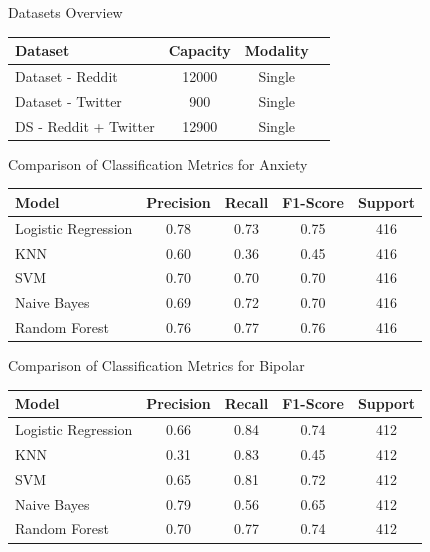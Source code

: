 \begin{center}
    \centering
    Datasets Overview \\
    \vspace{0.05in}
    \begin{tabular}{|l|c|c|c|}
    \hline
    \textbf{Dataset} & \textbf{Capacity} & \textbf{Modality} \\ \hline
    Dataset - Reddit  & 12000              & Single            \\ \hline
    Dataset - Twitter  & 900                & Single            \\ \hline
    DS - Reddit + Twitter & 12900          & Single            \\ \hline
    \end{tabular}

    \vspace{0.25in}

\centering
Comparison of Classification Metrics for Anxiety
\begin{tabular}{|l|c|c|c|c|}
\hline
\textbf{Model} & \textbf{Precision} & \textbf{Recall} & \textbf{F1-Score} & \textbf{Support} \\ \hline
Logistic Regression & 0.78 & 0.73 & 0.75 & 416 \\ \hline
KNN                & 0.60 & 0.36 & 0.45 & 416 \\ \hline
SVM                & 0.70 & 0.70 & 0.70 & 416 \\ \hline
Naive Bayes        & 0.69 & 0.72 & 0.70 & 416 \\ \hline
Random Forest      & 0.76 & 0.77 & 0.76 & 416 \\ \hline
\end{tabular}

\vspace{0.25in}

\centering
Comparison of Classification Metrics for Bipolar
\begin{tabular}{|l|c|c|c|c|}
\hline
\textbf{Model} & \textbf{Precision} & \textbf{Recall} & \textbf{F1-Score} & \textbf{Support} \\ \hline
Logistic Regression & 0.66 & 0.84 & 0.74 & 412 \\ \hline
KNN                & 0.31 & 0.83 & 0.45 & 412 \\ \hline
SVM                & 0.65 & 0.81 & 0.72 & 412 \\ \hline
Naive Bayes        & 0.79 & 0.56 & 0.65 & 412 \\ \hline
Random Forest      & 0.70 & 0.77 & 0.74 & 412 \\ \hline
\end{tabular}


\end{center}
